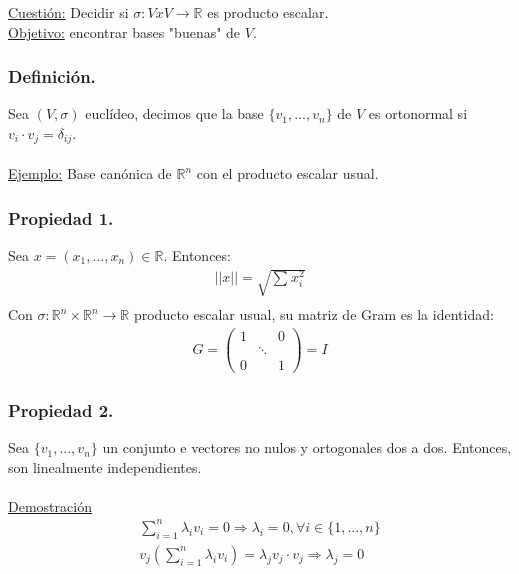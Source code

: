 \documentclass[12pt, a4paper, ones, notitlepage, openany,titlepage]{article}
\newcommand{\demostracion}{\noindent\underline{Demostración}}
\begin{document}
\begin{enumerate}
	\underline{Cuestión:} Decidir si $\sigma : VxV \longrightarrow \mathbb{R}$ es producto escalar.\\
	\underline{Objetivo:} encontrar bases "buenas" de $V$.
\end{enumerate}

\subsubsection{Definición.} Sea $(V,\sigma)$ euclídeo, decimos que la base $\{v_{1},...,v_{n}\}$ de $V$ es ortonormal si \\ $v_{i} \cdot v_{j} = \delta_{ij}$.\\\\
\underline{Ejemplo:} Base canónica de $\mathbb{R}^{n}$ con el producto escalar usual.

\subsubsection{Propiedad 1.}
Sea $x = (x_1,...,x_n) \in \mathbb{R}$. Entonces:
\begin{align*}
	||x|| = \sqrt{\sum_{}^{}x_i^2}\\
\end{align*}
Con $\sigma: \mathbb{R}^n \times \mathbb{R}^n \longrightarrow \mathbb{R}$ producto escalar usual, su matriz de Gram es la identidad:
\begin{align*}
	G = \left(
	\begin{matrix}
		1 &        & 0 \\
		& \ddots &   \\
		0 &        & 1
	\end{matrix}
	\right) = I
\end{align*}

\subsubsection{Propiedad 2.}
Sea $\{v_1,...,v_n\}$ un conjunto e vectores no nulos y ortogonales dos a dos. Entonces, son linealmente independientes.\\\\
\demostracion
\begin{align*}
	\sum_{i=1}^{n} \lambda_i v_i = 0 \Longrightarrow \lambda_i = 0, \forall i \in \{1,...,n\}\\
	v_j \left( \sum_{i=1}^{n} \lambda_i v_i \right) = \lambda_j v_j \cdot v_j \Longrightarrow \lambda_j = 0
\end{align*}
\end{document}
